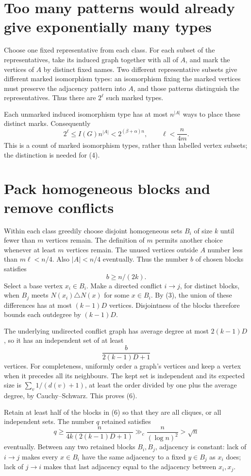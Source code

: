 \documentclass[11pt]{article}
\begin{document}
\section*{Too many patterns would already give exponentially many types}
Choose one fixed representative from each class. For each subset of the representatives, take its induced graph together with all of $A$, and mark the vertices of $A$ by distinct fixed names. Two different representative subsets give different marked isomorphism types: an isomorphism fixing the marked vertices must preserve the adjacency pattern into $A$, and those patterns distinguish the representatives. Thus there are $2^\ell$ such marked types.

Each unmarked induced isomorphism type has at most $n^{|A|}$ ways to place these distinct marks. Consequently
\[
 2^\ell\le I(G)n^{|A|}<2^{(\beta+\alpha)n},
 \qquad \ell<\frac n{4m}.\tag{4}
\]
This is a count of marked isomorphism types, rather than labelled vertex subsets; the distinction is needed for (4).

\section*{Pack homogeneous blocks and remove conflicts}
Within each class greedily choose disjoint homogeneous sets $B_i$ of size $k$ until fewer than $m$ vertices remain. The definition of $m$ permits another choice whenever at least $m$ vertices remain. The unused vertices outside $A$ number less than $m\ell<n/4$. Also $|A|<n/4$ eventually. Thus the number $b$ of chosen blocks satisfies
\[
 b\ge n/(2k).\tag{5}
\]
Select a base vertex $x_i\in B_i$. Make a directed conflict $i\to j$, for distinct blocks, when $B_j$ meets $N(x_i)\triangle N(x)$ for some $x\in B_i$. By (3), the union of these differences has at most $(k-1)D$ vertices. Disjointness of the blocks therefore bounds each outdegree by $(k-1)D$.

The underlying undirected conflict graph has average degree at most $2(k-1)D$, so it has an independent set of at least
\[
 \frac{b}{2(k-1)D+1}
\tag{6}
\]
vertices. For completeness, uniformly order a graph's vertices and keep a vertex when it precedes all its neighbours. The kept set is independent and its expected size is $\sum_v1/(d(v)+1)$, at least the order divided by one plus the average degree, by Cauchy--Schwarz. This proves (6).

Retain at least half of the blocks in (6) so that they are all cliques, or all independent sets. The number $q$ retained satisfies
\[
 q\ge\frac{n}{4k(2(k-1)D+1)}\gg_c\frac n{(\log n)^2}>\sqrt n
\tag{7}
\]
eventually. Between any two retained blocks $B_i,B_j$, adjacency is constant: lack of $i\to j$ makes every $x\in B_i$ have the same adjacency to a fixed $y\in B_j$ as $x_i$ does; lack of $j\to i$ makes that last adjacency equal to the adjacency between $x_i,x_j$.
\end{document}
